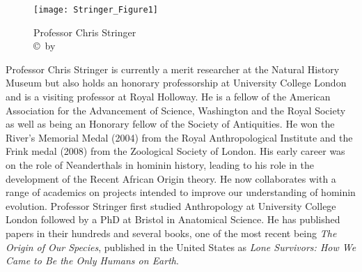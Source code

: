 \documentclass{ijsra}
\begin{document}
\IJSRAopening
\begin{figure}[!b]
\centering
	\texttt{[image: Stringer\_Figure1]}
	\caption{Professor Chris Stringer
	{\normalfont\scriptsize\\ \copyright\ by
                  }}
	\label{fig:Stringer_Figure1}
\end{figure}
Professor Chris Stringer is currently a merit researcher at the Natural History Museum but also holds
an honorary professorship at University College London and is a visiting professor at Royal Holloway.
He is a fellow of the American Association for the Advancement of Science, Washington and the Royal Society as well as
being an Honorary fellow of the Society of Antiquities. 
He won the River’s Memorial Medal (2004) from the Royal Anthropological Institute and the Frink medal (2008) from
the Zoological Society of London. His early career was on the role of Neanderthals in hominin history,
leading to his role in the development of the Recent African Origin theory.
He now collaborates with a range of academics on projects intended to improve our understanding of hominin evolution.
Professor Stringer first studied Anthropology at University College London followed by a PhD at Bristol in Anatomical Science.
He has published papers in their hundreds and several books, one of the most recent being \emph{The Origin of Our Species},
published in the United States as \emph{Lone Survivors: How We Came to Be the Only Humans on Earth}.
\end{document}
